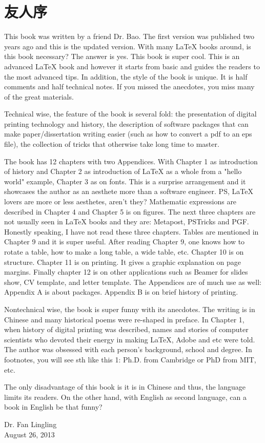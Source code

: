 \chapter{友人序}

This book was written by a friend Dr. Bao. The first version was published two years ago and this is the updated version. With many \LaTeX{} books around, is this book necessary? The answer is yes. This book is super cool. This is an advanced \LaTeX{} book and however it starts from basic and guides the readers to the most advanced tips. In addition, the style of the book is unique. It is half comments and half technical notes. If you missed the anecdotes, you miss many of the great materials.

Technical wise, the feature of the book is several fold: the presentation of digital printing technology and history, the description of software packages that can make paper/dissertation writing easier (such as how to convert a pdf to an eps file), the collection of tricks that otherwise take long time to master.

The book has 12 chapters with two Appendices. With Chapter 1 as introduction of history and Chapter 2 as introduction of \LaTeX{} as a whole from a "hello world" example, Chapter 3 as on fonts. This is a surprise arrangement and it showcases the author as an aesthete more than a software engineer. PS, \LaTeX{} lovers are more or less aesthetes, aren't they? Mathematic expressions are described in Chapter 4 and Chapter 5 is on figures. The next three chapters are not usually seen in \LaTeX{} books and they are: Metapost, PSTricks and PGF. Honestly speaking, I have not read these three chapters. Tables are mentioned in Chapter 9 and it is super useful. After reading Chapter 9, one knows how to rotate a table, how to make a long table, a wide table, etc. Chapter 10 is on structure. Chapter 11 is on printing. It gives a graphic explanation on page margins. Finally chapter 12 is on other applications such as Beamer for slides show, CV template, and letter template. The Appendices are of much use as well: Appendix A is about packages. Appendix B is on brief history of printing.

Nontechnical wise, the book is super funny with its anecdotes. The writing is in Chinese and many historical poems were re-shaped in preface. In Chapter 1, when history of digital printing was described, names and stories of computer scientists who devoted their energy in making \LaTeX{}, Adobe and etc were told. The author was obsessed with each person's background, school and degree. In footnotes, you will see sth like this 1: Ph.D. from Cambridge or PhD from MIT, etc.

The only disadvantage of this book is it is in Chinese and thus, the language limits its readers. On the other hand, with English as second language, can a book in English be that funny?

\begin{flushright}
Dr. Fan Lingling \\
August 26, 2013
\end{flushright}
